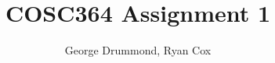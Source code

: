 \documentclass[12pt,twoside]{article}
\begin{document}
\title{COSC364 Assignment 1}
\author{George Drummond, Ryan Cox}
\maketitle
\thispagestyle{empty}

\begin{abstract}

\end{abstract}
\end{document}

